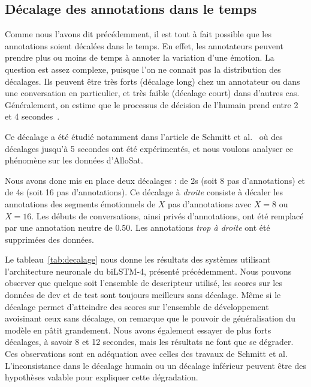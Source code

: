 
\subsection{Décalage des annotations dans le temps}

Comme nous l'avons dit précédemment, il est tout à fait possible que les annotations soient décalées dans le temps. En effet, les annotateurs peuvent prendre plus ou moins de temps à annoter la variation d'une émotion.
La question est assez complexe, puisque l'on ne connait pas la distribution des décalages. Ils peuvent être très forts (décalage long) chez un annotateur ou dans une conversation en particulier, et très faible (décalage court) dans d'autres cas. Généralement, on estime que le processus de décision de l'humain prend entre 2 et 4 secondes~\cite{Huang2015,Mariooryad2014}.

Ce décalage a été étudié notamment dans l'article de Schmitt et al.~\cite{Schmitt2019} où des décalages jusqu'à 5 secondes ont été expérimentés, et nous voulons analyser ce phénomène sur les données d'AlloSat.

Nous avons donc mis en place deux décalages : de 2s (soit 8 pas d'annotations) et de 4s (soit 16 pas d'annotations). Ce décalage à \textit{droite} consiste à décaler les annotations des segments émotionnels de $X$ pas d'annotations avec $X=8$ ou $X=16$. Les débuts de conversations, ainsi privés d'annotations, ont été remplacé par une annotation neutre de $0.50$. Les annotations \textit{trop à droite} ont été supprimées des données.



Le tableau~\ref{tab:decalage} nous donne les résultats des systèmes utilisant l'architecture neuronale du biLSTM-4, présenté précédemment. Nous pouvons observer que quelque soit l'ensemble de descripteur utilisé, les scores sur les données de dev et de test sont toujours meilleurs sans décalage. Même si le décalage permet d'atteindre des scores sur l'ensemble de développement avoisinant ceux sans décalage, on remarque que le pouvoir de généralisation du modèle en pâtit grandement. Nous avons également essayer de plus forts décalages, à savoir 8 et 12 secondes, mais les résultats ne font que se dégrader. Ces observations sont en adéquation avec celles des travaux de Schmitt et al. L'inconsistance dans le décalage humain ou un décalage inférieur peuvent être des hypothèses valable pour expliquer cette dégradation.

